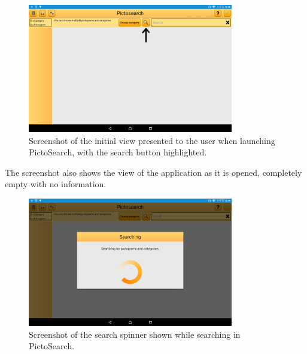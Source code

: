 \begin{figure}[h]
    \centering
    \includegraphics[width=0.8\textwidth]{figures/img/screenshots/old_startup.png}
    \caption{Screenshot of the initial view presented to the user when launching PictoSearch, with the search button highlighted.}\label{fig:screenshot_startup}
\end{figure}
\noindent
The screenshot also shows the view of the application as it is opened, completely empty with no information.

\begin{figure}[h]
    \centering
    \includegraphics[width=0.8\textwidth]{figures/img/screenshots/old_dialog.png}
    \caption{Screenshot of the search spinner shown while searching in PictoSearch.}\label{fig:screenshot_searchspinner}
\end{figure}

